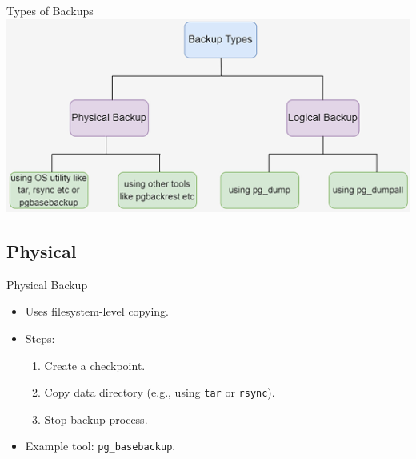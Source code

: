 \documentclass[aspectratio=169]{beamer}
\begin{document}
\begin{frame}{Types of Backups}
    \centering
    \includegraphics[width=\textwidth]{figures/backup_types}
\end{frame}

\subsection{Physical}

\begin{frame}{Physical Backup}
    \begin{itemize}
        \item Uses filesystem-level copying.
        \item Steps:
        \begin{enumerate}
            \item Create a checkpoint.
            \item Copy data directory (e.g., using \texttt{tar} or \texttt{rsync}).
            \item Stop backup process.
        \end{enumerate}
        \item Example tool: \texttt{pg\_basebackup}.
    \end{itemize}
\end{frame}
\end{document}

